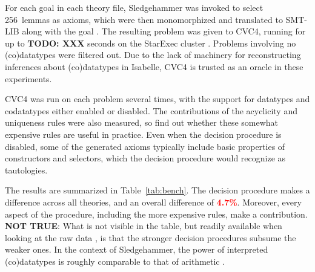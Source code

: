 For each goal in each theory file, Sledgehammer was invoked to select
256~lemmas as axioms, which were then monomorphized and translated to SMT-LIB
along with the goal \cite{boehme-2012-phd}. The resulting problem was given to
CVC4, running for up to \textbf{TODO: XXX} seconds on the StarExec cluster
\cite{xxx}. Problems involving no (co)datatypes were filtered out.
Due to the lack of machinery for reconstructing inferences about (co)datatypes
in Isabelle, CVC4 is trusted as an oracle in these experiments.

CVC4 was run on each problem several times, with the support for datatypes and
codatatypes either enabled or disabled. The contributions of the acyclicity and
uniqueness rules were also measured, so find out whether these somewhat
expensive rules are useful in practice. Even when the decision procedure is
disabled, some of the generated axioms typically include basic properties of
constructors and selectors, which the decision procedure would recognize as
tautologies.

\newcommand\BAD[1]{\textcolor{red}{\textbf{#1}}}



The results are summarized in Table~\ref{tab:bench}. The decision procedure
makes a difference across all theories, and an overall difference of
\BAD{4.7\%}. Moreover, every aspect of the procedure, including the more
expensive rules, make a contribution. \textbf{NOT TRUE}: What is not visible in the table, but
readily available when looking at the raw data \cite{our-eval-data}, is that
the stronger decision procedures subsume the weaker ones. In the context of
Sledgehammer, the power of interpreted (co)datatypes is roughly
comparable to that of arithmetic \cite{blanchette-et-al-2013-smt}.



